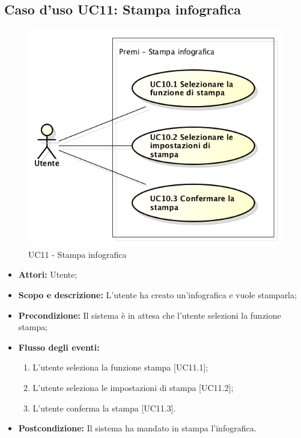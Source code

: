 \subsection{Caso d'uso UC11: Stampa infografica}
\begin{figure}[h] 
	\centering 
	\includegraphics[scale=0.45] {img/UC11.png} 
	\caption{UC11 - Stampa infografica} 
\end{figure}

\begin{itemize}
	\item \textbf{Attori:} Utente;
	\item \textbf{Scopo e descrizione:} L'utente ha creato un'infografica e vuole stamparla;
	\item \textbf{Precondizione:} Il sistema è in attesa che l'utente selezioni la funzione stampa;
	\item \textbf{Flusso degli eventi:}
	\begin{enumerate}
		\item L'utente seleziona la funzione stampa [UC11.1];
		\item L'utente seleziona le impostazioni di stampa [UC11.2];
		\item L'utente conferma la stampa [UC11.3].
	\end{enumerate}
	\item \textbf{Postcondizione:} Il sistema ha mandato in stampa l'infografica.
\end{itemize}

